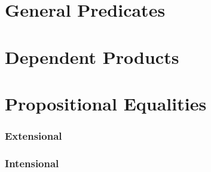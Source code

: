 
\appendix

\section{General Predicates}

\section{Dependent Products}

\section{Propositional Equalities}
\subsubsection*{Extensional}

\subsubsection*{Intensional}

